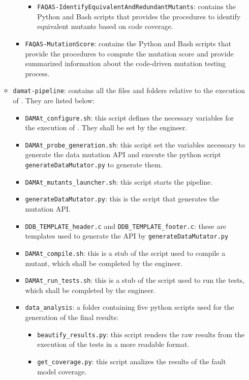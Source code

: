 \begin{itemize}
\begin{itemize}
\begin{itemize}
\begin{itemize}
				\item \texttt{FAQAS-IdentifyEquivalentAndRedundantMutants}: contains the Python and Bash scripts that provides the procedures to identify equivalent mutants based on code coverage.
			\end{itemize}
			\item \texttt{FAQAS-MutationScore}: contains the Python and Bash scripts that provide the procedures to compute the mutation score and provide summarized information about the code-driven mutation testing process.
		\end{itemize}

		\item \texttt{damat-pipeline}: contains all the files and folders relative to the execution of \DAMA. They are listed below:
		\begin{itemize}
			\item \texttt{DAMAt\_configure.sh}: this script defines the necessary variables for the execution of \DAMA. They shall be set by the engineer.
			\item \texttt{DAMAt\_probe\_generation.sh}: this script set the variables necessary to generate the data mutation API and execute the python script \texttt{generateDataMutator.py} to generate them.
			\item \texttt{DAMAt\_mutants\_launcher.sh}: this script starts the \DAMA pipeline.
			\item \texttt{generateDataMutator.py}: this is the script that generates the \DAMA mutation API.
			\item \texttt{DDB\_TEMPLATE\_header.c} and \texttt{DDB\_TEMPLATE\_footer.c}: these are templates used to generate the \DAMA API by \texttt{generateDataMutator.py}
			\item \texttt{DAMAt\_compile.sh}: this is a stub of the script used to compile a mutant, which shall be completed by the engineer.
			\item \texttt{DAMAt\_run\_tests.sh}: this is a stub of the script used to run the tests, which shall be completed by the engineer.
			\item \texttt{data\_analysis}: a folder containing five python scripts used for the generation of the final results:
			\begin{itemize}
				\item \texttt{beautify\_results.py}: this script renders the raw results from the execution of the tests in a more readable format.
				\item \texttt{get\_coverage.py}: this script analizes the results of the fault model coverage.

\end{itemize}
\end{itemize}
\end{itemize}
\end{itemize}
